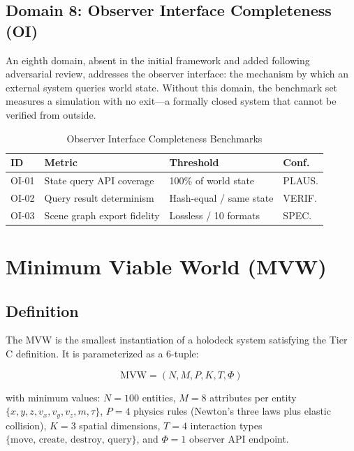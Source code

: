 \documentclass[conference]{IEEEtran}
\begin{document}
\subsection{Domain 8: Observer Interface Completeness (OI)}

An eighth domain, absent in the initial framework and added following adversarial
review, addresses the observer interface: the mechanism by which an external
system queries world state. Without this domain, the benchmark set measures a
simulation with no exit---a formally closed system that cannot be verified from
outside.

\begin{table}[ht]
\caption{Observer Interface Completeness Benchmarks}
\label{tab:oi}
\centering
\small
\begin{tabular}{p{0.7cm}p{3.2cm}p{1.8cm}p{1.0cm}}
\toprule
\textbf{ID} & \textbf{Metric} & \textbf{Threshold} & \textbf{Conf.} \\
\midrule
OI-01 & State query API coverage & 100\% of world state & PLAUS. \\
OI-02 & Query result determinism & Hash-equal / same state & VERIF. \\
OI-03 & Scene graph export fidelity & Lossless / 10 formats & SPEC. \\
\bottomrule
\end{tabular}
\end{table}

\section{Minimum Viable World (MVW)}

\subsection{Definition}

The MVW is the smallest instantiation of a holodeck system satisfying the Tier C
definition. It is parameterized as a 6-tuple:

\begin{equation}
    \text{MVW} = (N, M, P, K, T, \Phi)
\end{equation}

with minimum values: $N=100$ entities, $M=8$ attributes per entity
$\{x,y,z,v_x,v_y,v_z,m,\tau\}$, $P=4$ physics rules (Newton's three laws plus
elastic collision), $K=3$ spatial dimensions, $T=4$ interaction types
$\{\text{move, create, destroy, query}\}$, and $\Phi=1$ observer API endpoint.
\end{document}
